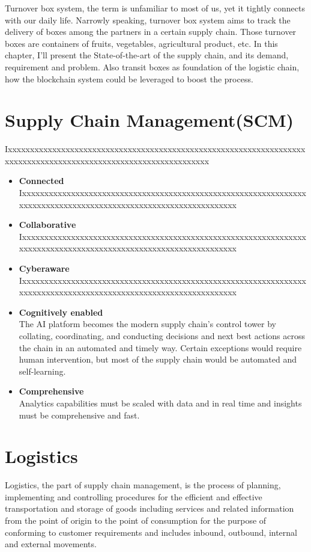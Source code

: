 Turnover box system, the term is unfamiliar to most of us, yet it tightly connects with our daily life. Narrowly speaking, turnover box system aims to track the delivery of boxes among the partners in a certain supply chain. Those turnover boxes are containers of fruits, vegetables,
agricultural product, etc. In this chapter, I'll present the State-of-the-art of the supply chain, and its demand, requirement and problem. Also transit boxes as foundation of the logistic chain, how the blockchain system could be leveraged to boost the process.

\section{Supply Chain Management(SCM)} 
Ixxxxxxxxxxxxxxxxxxxxxxxxxxxxxxxxxxxxxxxxxxxxxxxxxxxxxxxxxxxxxxxxxxxxxxxxxxxxxxxxxxxxxxxxxxxxxxxxxxxxxxxxxxxxxxxxx

\begin{itemize}
	\item \textbf{Connected}\\
Ixxxxxxxxxxxxxxxxxxxxxxxxxxxxxxxxxxxxxxxxxxxxxxxxxxxxxxxxxxxxxxxxxxxxxxxxxxxxxxxxxxxxxxxxxxxxxxxxxxxxxxxxxxxxxxxxx
	\item \textbf{ Collaborative}\\
Ixxxxxxxxxxxxxxxxxxxxxxxxxxxxxxxxxxxxxxxxxxxxxxxxxxxxxxxxxxxxxxxxxxxxxxxxxxxxxxxxxxxxxxxxxxxxxxxxxxxxxxxxxxxxxxxxx
	\item \textbf{Cyberaware}\\Ixxxxxxxxxxxxxxxxxxxxxxxxxxxxxxxxxxxxxxxxxxxxxxxxxxxxxxxxxxxxxxxxxxxxxxxxxxxxxxxxxxxxxxxxxxxxxxxxxxxxxxxxxxxxxxxxx
	\item \textbf{Cognitively enabled}\\
	The AI platform becomes the modern supply chain's control tower by
	collating, coordinating, and conducting decisions and next best actions across the chain in an
	automated and timely way. Certain exceptions would require human
	intervention, but most of the supply chain would be automated and self-learning.
	\item \textbf{Comprehensive}\\
	Analytics capabilities must be scaled with data and in real time and insights must be comprehensive and fast.
\end{itemize}

\section{Logistics}
Logistics, the part of supply chain management, is the process of planning, implementing and controlling procedures for the efficient and effective transportation and storage of goods including services and related information from the point of origin to the point of consumption for the purpose of conforming to customer requirements and includes inbound, outbound, internal and external movements.

